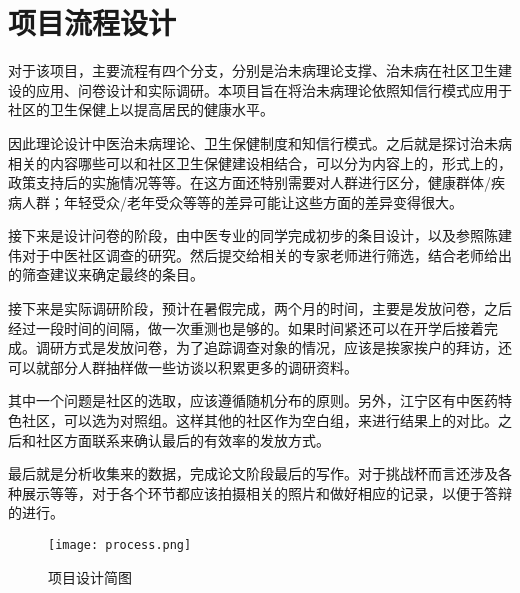 \section{项目流程设计}
对于该项目，主要流程有四个分支，分别是治未病理论支撑、治未病在社区卫生建设的应用、问卷设计和实际调研。本项目旨在将治未病理论依照知信行模式应用于社区的卫生保健上以提高居民的健康水平。

因此理论设计中医治未病理论、卫生保健制度和知信行模式。之后就是探讨治未病相关的内容哪些可以和社区卫生保健建设相结合，可以分为内容上的，形式上的，政策支持后的实施情况等等。在这方面还特别需要对人群进行区分，健康群体/疾病人群；年轻受众/老年受众等等的差异可能让这些方面的差异变得很大。

接下来是设计问卷的阶段，由中医专业的同学完成初步的条目设计，以及参照陈建伟对于中医社区调查的研究。然后提交给相关的专家老师进行筛选，结合老师给出的筛查建议来确定最终的条目。

接下来是实际调研阶段，预计在暑假完成，两个月的时间，主要是发放问卷，之后经过一段时间的间隔，做一次重测也是够的。如果时间紧还可以在开学后接着完成。调研方式是发放问卷，为了追踪调查对象的情况，应该是挨家挨户的拜访，还可以就部分人群抽样做一些访谈以积累更多的调研资料。

其中一个问题是社区的选取，应该遵循随机分布的原则。另外，江宁区有中医药特色社区，可以选为对照组。这样其他的社区作为空白组，来进行结果上的对比。之后和社区方面联系来确认最后的有效率的发放方式。

最后就是分析收集来的数据，完成论文阶段最后的写作。对于挑战杯而言还涉及各种展示等等，对于各个环节都应该拍摄相关的照片和做好相应的记录，以便于答辩的进行。

\begin{figure}[th]
	\texttt{[image: process.png]}
	\centering
	\caption{项目设计简图}
\end{figure}